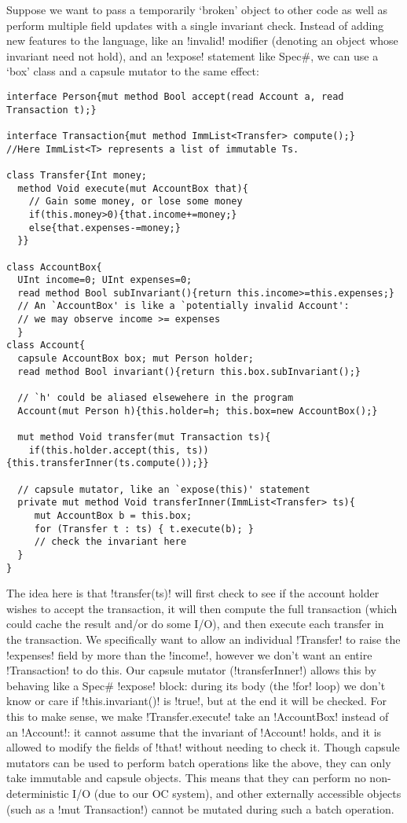  Suppose we want to pass a temporarily `broken' object to other code as well as perform multiple field updates with a single invariant check. 
Instead of adding new features to the language, like an \Q!invalid! modifier (denoting an object whose invariant need not hold), and an \Q!expose! statement like Spec\#, we can use a `box' class and a capsule mutator to the same effect:
\begin{lstlisting}
interface Person{mut method Bool accept(read Account a, read Transaction t);}

interface Transaction{mut method ImmList<Transfer> compute();}
//Here ImmList<T> represents a list of immutable Ts.

class Transfer{Int money;
  method Void execute(mut AccountBox that){
    // Gain some money, or lose some money
    if(this.money>0){that.income+=money;}
    else{that.expenses-=money;}
  }}

class AccountBox{
  UInt income=0; UInt expenses=0;
  read method Bool subInvariant(){return this.income>=this.expenses;}
  // An `AccountBox' is like a `potentially invalid Account':
  // we may observe income >= expenses
  }
class Account{
  capsule AccountBox box; mut Person holder;
  read method Bool invariant(){return this.box.subInvariant();}

  // `h' could be aliased elsewehere in the program    
  Account(mut Person h){this.holder=h; this.box=new AccountBox();}

  mut method Void transfer(mut Transaction ts){
    if(this.holder.accept(this, ts)){this.transferInner(ts.compute());}}

  // capsule mutator, like an `expose(this)' statement
  private mut method Void transferInner(ImmList<Transfer> ts){
     mut AccountBox b = this.box;
     for (Transfer t : ts) { t.execute(b); }
     // check the invariant here
  }
}
\end{lstlisting}
The idea here is that \Q!transfer(ts)! will first check to see if the account holder wishes to accept the transaction, it will then compute the full transaction (which could cache the result and/or do some I/O), and then execute each transfer in the transaction. We specifically want to allow an individual \Q!Transfer! to raise the \Q!expenses! field by more than the \Q!income!, however we don't want an entire \Q!Transaction! to do this. 
Our capsule mutator (\Q!transferInner!) allows this by behaving like a Spec\# \Q!expose! block: during its body (the \Q!for! loop) we don't know or care if \Q!this.invariant()! is \Q!true!, but at the end it will be checked. For this to make sense, we make \Q!Transfer.execute! take an \Q!AccountBox! instead of an \Q!Account!: it cannot assume that the invariant of \Q!Account! holds, and it is allowed to modify the fields of \Q!that! without needing to check it. Though capsule mutators can be used to perform batch operations like the above, they can only take immutable and capsule objects. This means that they can perform no non-deterministic I/O (due to our OC system), and other externally accessible objects (such as a \Q!mut Transaction!) cannot be mutated during such a batch operation.

